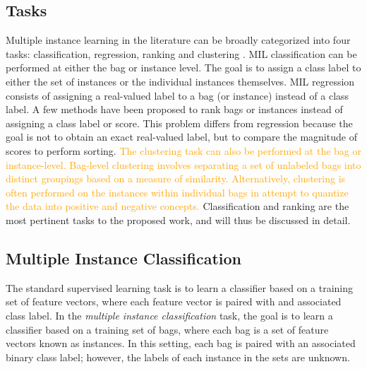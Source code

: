 \subsection{Tasks}
Multiple instance learning in the literature can be broadly categorized into four tasks: classification, regression, ranking and clustering \citep{Carbonneau2016MILSurvey}.  MIL classification can be performed at either the bag or instance level.  The goal is to assign a class label to either the set of instances or the individual instances themselves.  MIL regression consists of assigning a real-valued label to a bag (or instance) instead of a class label.  A few methods have been proposed to rank bags or instances instead of assigning a class label or score.  This problem differs from regression because the goal is not to obtain an exact real-valued label, but to compare the magnitude of scores to perform sorting.  \textcolor{orange}{The clustering task can also be performed at the bag or instance-level.  Bag-level clustering involves separating a set of unlabeled bags into distinct groupings based on a measure of similarity.  Alternatively, clustering is often performed on the instances within individual bags in attempt to quantize the data into positive and negative concepts.}  Classification and ranking are the most pertinent tasks to the proposed work, and will thus be discussed in detail.

\subsection{Multiple Instance Classification}
The standard supervised learning task is to learn a classifier based on a training set of feature vectors, where each feature vector is paired with and associated class label.  In the \textit{multiple instance classification} task, the goal is to learn a classifier based on a training set of bags, where each bag is a set of feature vectors known as instances.  In this setting, each bag is paired with an associated binary class label; however, the labels of each instance in the sets are unknown. 

